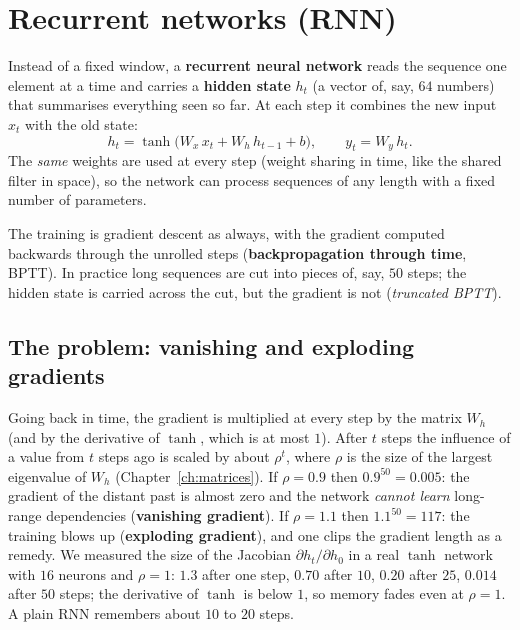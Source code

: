 \section*{Recurrent networks (RNN)}
Instead of a fixed window, a \textbf{recurrent neural network} reads the sequence one element at a time and carries a \textbf{hidden state} $h_t$ (a vector of, say, $64$ numbers) that summarises everything seen so far. At each step it combines the new input $x_t$ with the old state:
\[
h_t=\tanh\!\big(W_x\,x_t+W_h\,h_{t-1}+b\big),\qquad y_t=W_y\,h_t.
\]
The \emph{same} weights are used at every step (weight sharing in time, like the shared filter in space), so the network can process sequences of any length with a fixed number of parameters.
\begin{center}
\end{center}
The training is gradient descent as always, with the gradient computed backwards through the unrolled steps (\textbf{backpropagation through time}, BPTT). In practice long sequences are cut into pieces of, say, $50$ steps; the hidden state is carried across the cut, but the gradient is not (\emph{truncated BPTT}).

\subsection*{The problem: vanishing and exploding gradients}
Going back in time, the gradient is multiplied at every step by the matrix $W_h$ (and by the derivative of $\tanh$, which is at most $1$). After $t$ steps the influence of a value from $t$ steps ago is scaled by about $\rho^t$, where $\rho$ is the size of the largest eigenvalue of $W_h$ (Chapter~\ref{ch:matrices}). If $\rho=0.9$ then $0.9^{50}=0.005$: the gradient of the distant past is almost zero and the network \emph{cannot learn} long-range dependencies (\textbf{vanishing gradient}). If $\rho=1.1$ then $1.1^{50}=117$: the training blows up (\textbf{exploding gradient}), and one clips the gradient length as a remedy. We measured the size of the Jacobian $\partial h_t/\partial h_0$ in a real $\tanh$ network with $16$ neurons and $\rho=1$: $1.3$ after one step, $0.70$ after $10$, $0.20$ after $25$, $0.014$ after $50$ steps; the derivative of $\tanh$ is below $1$, so memory fades even at $\rho=1$. A plain RNN remembers about $10$ to $20$ steps.

